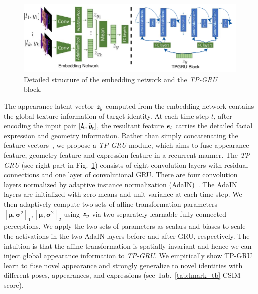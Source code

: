 \documentclass[runningheads]{llncs}
\def\mathbi#1{\textbf{\em #1}}
\begin{document}
\begin{figure}
\includegraphics[width=1.0 \linewidth]{latex/images/network_details_reduce.pdf}
\caption{Detailed structure of the embedding network and the \textit{TP-GRU} block.}
\label{fig:network_details}
\end{figure}
\indent The appearance latent vector $\mathbi{z}_y$ computed from the embedding network contains the global texture information of target identity. At each time step $t$, after encoding the input pair $[\mathbi{l}_t, \tilde{\mathbi{y}}_{t}]$, the resultant feature $\mathbi{e}_t$ carries the detailed facial expression and geometry information. Rather than simply concatenating the feature vectors~\cite{chung2017you,zhou2019talking,chen2018lip,chen2019hierarchical,ijcai2019-129}, we propose a \textit{TP-GRU} module, which aims to fuse appearance feature, geometry feature and expression feature in a recurrent manner. The \textit{TP-GRU} (see right part in Fig.~\ref{fig:network_details}) consists of eight convolution layers with residual connections and one layer of convolutional GRU. There are four convolution layers normalized by adaptive instance normalization (AdaIN)~\cite{huang2017arbitrary}. The AdaIN layers are initialized with zero means and unit variance at each time step. We then adaptively compute two sets of affine transformation parameters $[\boldsymbol{\mu},\boldsymbol{\sigma}^2]_1, [\boldsymbol{\mu},\boldsymbol{\sigma}^2]_2$ using $\mathbi{z}_y$ via two separately-learnable fully connected perceptions. We apply the two sets of parameters as scalars and biases to scale the activations in the two AdaIN layers before and after GRU, respectively. The intuition is that the affine transformation is spatially invariant and hence we can inject global appearance information to \textit{TP-GRU}. We empirically show TP-GRU learn to fuse novel appearance and strongly generalize to novel identities with different poses, appearances, and expressions (see Tab.~\ref{tab:lmark_tb} CSIM score). 
\end{document}
